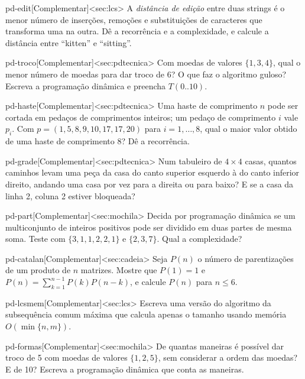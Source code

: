 \excompl
\begin{exercicio}{pd-edit}[Complementar]<sec:lcs>
A \emph{distância de edição} entre duas strings é o menor número de inserções, remoções e substituições de caracteres que transforma uma na outra. Dê a recorrência e a complexidade, e calcule a distância entre ``kitten'' e ``sitting''.
\end{exercicio}
\begin{exercicio}{pd-troco}[Complementar]<sec:pdtecnica>
Com moedas de valores $\{1,3,4\}$, qual o menor número de moedas para dar troco de 6? O que faz o algoritmo guloso? Escreva a programação dinâmica e preencha $T(0..10)$.
\end{exercicio}
\begin{exercicio}{pd-haste}[Complementar]<sec:pdtecnica>
Uma haste de comprimento $n$ pode ser cortada em pedaços de comprimentos inteiros; um pedaço de comprimento $i$ vale $p_i$. Com $p=(1,5,8,9,10,17,17,20)$ para $i=1,\dots,8$, qual o maior valor obtido de uma haste de comprimento 8? Dê a recorrência.
\end{exercicio}
\begin{exercicio}{pd-grade}[Complementar]<sec:pdtecnica>
Num tabuleiro de $4\times4$ casas, quantos caminhos levam uma peça da casa do canto superior esquerdo à do canto inferior direito, andando uma casa por vez para a direita ou para baixo? E se a casa da linha 2, coluna 2 estiver bloqueada?
\end{exercicio}
\begin{exercicio}{pd-part}[Complementar]<sec:mochila>
Decida por programação dinâmica se um multiconjunto de inteiros positivos pode ser dividido em duas partes de mesma soma. Teste com $\{3,1,1,2,2,1\}$ e $\{2,3,7\}$. Qual a complexidade?
\end{exercicio}
\begin{exercicio}{pd-catalan}[Complementar]<sec:cadeia>
Seja $P(n)$ o número de parentizações de um produto de $n$ matrizes. Mostre que $P(1)=1$ e $P(n)=\sum_{k=1}^{n-1}P(k)P(n-k)$, e calcule $P(n)$ para $n\le6$.
\end{exercicio}
\begin{exercicio}{pd-lcsmem}[Complementar]<sec:lcs>
Escreva uma versão do algoritmo da subsequência comum máxima que calcula apenas o tamanho usando memória $O(\min\{n,m\})$.
\end{exercicio}
\begin{exercicio}{pd-formas}[Complementar]<sec:mochila>
De quantas maneiras é possível dar troco de 5 com moedas de valores $\{1,2,5\}$, sem considerar a ordem das moedas? E de 10? Escreva a programação dinâmica que conta as maneiras.
\end{exercicio}
